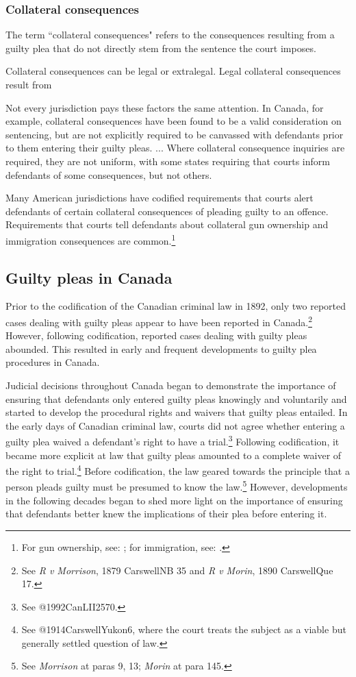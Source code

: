 \subsubsection{Collateral consequences}

The term ``collateral consequences" refers to the consequences resulting from a guilty plea that do not directly stem from the sentence the court imposes. 

Collateral consequences can be legal or extralegal. Legal collateral consequences result from 

Not every jurisdiction pays these factors the same attention. In Canada, for example, collateral consequences have been found to be a valid consideration on sentencing, but are not explicitly required to be canvassed with defendants prior to them entering their guilty pleas. ... Where collateral consequence inquiries are required, they are not uniform, with some states requiring that courts inform defendants of some consequences, but not others. 

Many American jurisdictions have codified requirements that courts alert defendants of certain collateral consequences of pleading guilty to an offence. Requirements that courts tell defendants about collateral gun ownership and immigration consequences are common.\footnote{For gun ownership, see: ; for immigration, see: .}

\subsection{Guilty pleas in Canada}

Prior to the codification of the Canadian criminal law in 1892, only two reported cases dealing with guilty pleas appear to have been reported in Canada.\footnote{See \textit{R v Morrison}, 1879 CarswellNB 35 and \textit{R v Morin}, 1890 CarswellQue 17.} However, following codification, reported cases dealing with guilty pleas abounded. This resulted in early and frequent developments to guilty plea procedures in Canada.  

Judicial decisions throughout Canada began to demonstrate the importance of ensuring that defendants only entered guilty pleas knowingly and voluntarily and started to develop the procedural rights and waivers that guilty pleas entailed. In the early days of Canadian criminal law, courts did not agree whether entering a guilty plea waived a defendant's right to have a trial.\footnote{See @1992CanLII2570.} Following codification, it became more explicit at law that guilty pleas amounted to a complete waiver of the right to trial.\footnote{See @1914CarswellYukon6, where the court treats the subject as a viable but generally settled question of law.} Before codification, the law geared towards the principle that a person pleads guilty must be presumed to know the law.\footnote{See \textit{Morrison} at paras 9, 13; \textit{Morin} at para 145.} However, developments in the following decades began to shed more light on the importance of ensuring that defendants better knew the implications of their plea before entering it.

